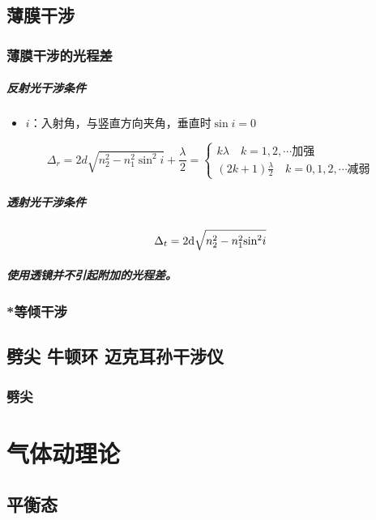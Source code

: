 \documentclass[UTF8,a4paper,12pt,scheme=chinese]{ctexbook}
\begin{document}
	\section{薄膜干涉}
	\subsection{薄膜干涉的光程差}
	\paragraph{反射光干涉条件}
	\begin{itemize}
		\item $ i $：入射角，与竖直方向夹角，垂直时$ \sin i=0 $
	\end{itemize}
	$${\Delta _r} = 2d\sqrt {n_2^2 - n_1^2{{\sin }^2}{i}}  + \frac{\lambda }{2} = \left\lbrace {\begin{array}{*{20}{c}}
		{k\lambda}\quad k=1,2,\cdots\mbox{加强}\\
		{\left( {2k + 1} \right)\frac{\lambda }{2}\quad k=0,1,2,\cdots\mbox{减弱}}
		\end{array}} \right.$$
	\paragraph{透射光干涉条件}
	$${\Delta _t} = 2{\rm{d}}\sqrt {n_2^2 - n_1^2{{\sin }^2}i} $$
	\paragraph{使用透镜并不引起附加的光程差。}
	\subsection{*等倾干涉}
	\section{劈尖 牛顿环 迈克耳孙干涉仪}
	\subsection{劈尖}
	
	
	\chapter{气体动理论}
	\section{平衡态}
\end{document}
